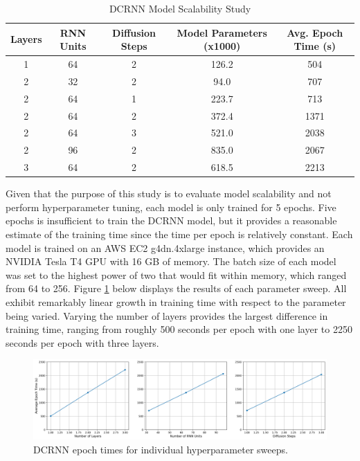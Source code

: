 \documentclass{article}
\begin{document}
\begin{table}[hbt!]
	\caption{DCRNN Model Scalability Study}
	\centering
	\begin{tabular}{ccccc}
		\toprule
		Layers   & RNN Units & Diffusion Steps & Model Parameters (x1000)   & Avg. Epoch Time (s) \\
		\midrule
		1        & 64        & 2               & 126.2                      & 504 \\
		2        & 32        & 2               & 94.0                       & 707 \\
		2        & 64        & 1               & 223.7                      & 713 \\
		2        & 64        & 2               & 372.4                      & 1371 \\
		2        & 64        & 3               & 521.0                      & 2038 \\
		2        & 96        & 2               & 835.0                      & 2067 \\
		3        & 64        & 2               & 618.5                      & 2213 \\
		\bottomrule
	\end{tabular}
	\label{tab:model-scale}
\end{table}

Given that the purpose of this study is to evaluate model scalability and not perform hyperparameter tuning, each model is only trained for 5 epochs. Five epochs is insufficient to train the DCRNN model, but it provides a reasonable estimate of the training time since the time per epoch is relatively constant. Each model is trained on an AWS EC2 g4dn.4xlarge instance, which provides an NVIDIA Tesla T4 GPU with 16 GB of memory. The batch size of each model was set to the highest power of two that would fit within memory, which ranged from 64 to 256. Figure \ref{fig:model-scale-split} below displays the results of each parameter sweep. All exhibit remarkably linear growth in training time with respect to the parameter being varied. Varying the number of layers provides the largest difference in training time, ranging from roughly 500 seconds per epoch with one layer to 2250 seconds per epoch with three layers.

\begin{figure}[hbt!]
	\centering
	\includegraphics[width=\textwidth]{images/model_scale_split.png}
	\caption{DCRNN epoch times for individual hyperparameter sweeps.}
	\label{fig:model-scale-split}
\end{figure}
\end{document}
